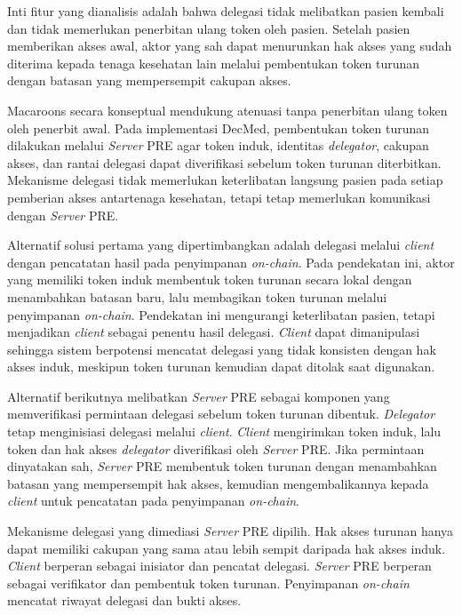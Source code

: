 \documentclass[bahasa, 12pt, a4paper, onecolumn, oneside, final]{report}
\begin{document}
Inti fitur yang dianalisis adalah bahwa delegasi tidak melibatkan pasien kembali dan tidak memerlukan penerbitan ulang token oleh pasien. Setelah pasien memberikan akses awal, aktor yang sah dapat menurunkan hak akses yang sudah diterima kepada tenaga kesehatan lain melalui pembentukan token turunan dengan batasan yang mempersempit cakupan akses.

Macaroons secara konseptual mendukung atenuasi tanpa penerbitan ulang token oleh penerbit awal. Pada implementasi DecMed, pembentukan token turunan dilakukan melalui \textit{Server} PRE agar token induk, identitas \textit{delegator}, cakupan akses, dan rantai delegasi dapat diverifikasi sebelum token turunan diterbitkan. Mekanisme delegasi tidak memerlukan keterlibatan langsung pasien pada setiap pemberian akses antartenaga kesehatan, tetapi tetap memerlukan komunikasi dengan \textit{Server} PRE.

Alternatif solusi pertama yang dipertimbangkan adalah delegasi melalui \textit{client} dengan pencatatan hasil pada penyimpanan \textit{on-chain}. Pada pendekatan ini, aktor yang memiliki token induk membentuk token turunan secara lokal dengan menambahkan batasan baru, lalu membagikan token turunan melalui penyimpanan \textit{on-chain}. Pendekatan ini mengurangi keterlibatan pasien, tetapi menjadikan \textit{client} sebagai penentu hasil delegasi. \textit{Client} dapat dimanipulasi sehingga sistem berpotensi mencatat delegasi yang tidak konsisten dengan hak akses induk, meskipun token turunan kemudian dapat ditolak saat digunakan.

Alternatif berikutnya melibatkan \textit{Server} PRE sebagai komponen yang memverifikasi permintaan delegasi sebelum token turunan dibentuk. \textit{Delegator} tetap menginisiasi delegasi melalui \textit{client}. \textit{Client} mengirimkan token induk, lalu token dan hak akses \textit{delegator} diverifikasi oleh \textit{Server} PRE. Jika permintaan dinyatakan sah, \textit{Server} PRE membentuk token turunan dengan menambahkan batasan yang mempersempit hak akses, kemudian mengembalikannya kepada \textit{client} untuk pencatatan pada penyimpanan \textit{on-chain}.

Mekanisme delegasi yang dimediasi \textit{Server} PRE dipilih. Hak akses turunan hanya dapat memiliki cakupan yang sama atau lebih sempit daripada hak akses induk. \textit{Client} berperan sebagai inisiator dan pencatat delegasi. \textit{Server} PRE berperan sebagai verifikator dan pembentuk token turunan. Penyimpanan \textit{on-chain} mencatat riwayat delegasi dan bukti akses.
\end{document}
